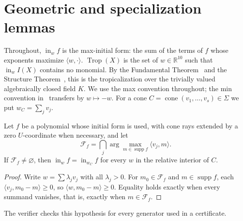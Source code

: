 \documentclass[11pt]{amsart}
\theoremstyle{definition}\newtheorem{definition}[theorem]{Definition}\theoremstyle{remark}\newtheorem{remark}[theorem]{Remark}
\newcommand{\Trop}{\operatorname{Trop}}\newcommand{\inn}{\operatorname{in}}\newcommand{\Q}{\mathbb{Q}}
\begin{document}
\section{Geometric and specialization lemmas}\label{sec:lemmas}
Throughout, $\inn_w f$ is the max-initial form: the sum of the terms of $f$ whose exponents maximize $\langle w,\cdot\rangle$.
$\Trop(X)$ is the set of $w\in\mathbb{R}^{10}$ such that $\inn_w I(X)$ contains no monomial.
By the Fundamental Theorem~\citep[Thm.~3.2.3]{MS} and the Structure Theorem~\citep[Thm.~3.3.5]{MS}, this is the tropicalization over the trivially valued algebraically closed field $K$. We use the max convention throughout; the min convention in~\citep{MS} transfers by $w\mapsto-w$.
For a cone $C=\operatorname{cone}(v_1,\dots,v_s)\in\Sigma$ we put $w_C=\sum_j v_j$.

\begin{lemma}\label{lem:A}
Let $f$ be a polynomial whose initial form is used, with cone rays extended by a zero $U$-coordinate when necessary, and let
\[
 \mathcal F_f=\bigcap_j\arg\max_{m\in\operatorname{supp} f}\langle v_j,m\rangle.
\]
If
$\mathcal F_f\ne\varnothing$, then $\inn_w f=\inn_{w_C} f$ for every $w$ in the relative interior of $C$.
\end{lemma}
\begin{proof}
Write $w=\sum\lambda_jv_j$ with all $\lambda_j>0$. For $m_0\in\mathcal F_f$ and $m\in\operatorname{supp}f$, each
$\langle v_j,m_0-m\rangle\ge0$, so $\langle w,m_0-m\rangle\ge0$. Equality holds exactly when every summand vanishes, that is, exactly when $m\in\mathcal F_f$.
\end{proof}
The verifier checks this hypothesis for every generator used in a certificate.
\end{document}
